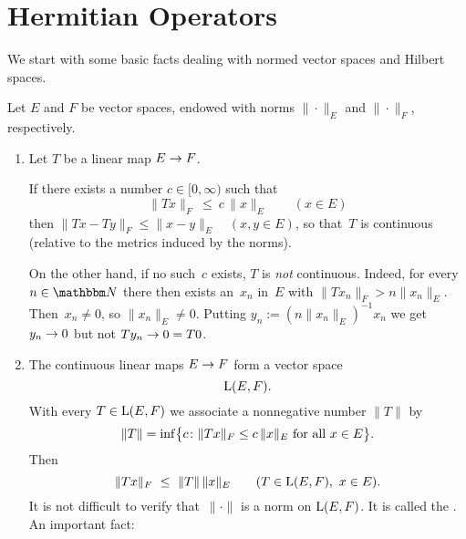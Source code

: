 \documentclass[main.tex]{subfiles}
\begin{document}
\section{Hermitian Operators}
We start with some basic facts dealing 
with normed vector spaces and Hilbert spaces.
%
%
\begin{psec}{5.1}%
Let $E$ and $F$ be vector spaces,
endowed with norms $\|\cdot\|_E$ and $\|\cdot\|_F$, respectively.
\begin{enumerate}
\item \label{5.1-1}
Let $T$ be a linear map $E\rightarrow F$.

If there exists a number $c\in [0,\infty)$ such that
\begin{equation*}
\|Tx\|_F \ \leq \ c\,\|x\|_E \qquad (x\in E)
\end{equation*}
then $\|Tx-Ty\|_F \leq \|x-y\|_E\quad (x,y\in E)$,
so that~$T$ is continuous
(relative to the metrics induced by the norms).

On the other hand,
if no such~$c$ exists,
$T$ is \emph{not} continuous.
Indeed,
for every $n\in\N$
there then exists an~$x_n$ in~$E$
with $\|T x_n\|_F > n \|x_n\|_E$.
Then~$x_n\neq 0$, so $\|x_n\|_E\neq 0$.
Putting $y_n:=(n\|x_n\|_E)^{-1}x_n$
we get $y_n\rightarrow 0$
but not $Ty_n\rightarrow 0=T0$.
%
\item \label{5.1-2}
The continuous linear maps $E\rightarrow F$ form a vector space
\begin{equation*}
\mathrm{L}(E,F)\text{.}
\end{equation*}
With every $T\in\mathrm{L}(E,F)$ 
we associate a nonnegative number $\| T \|$ by
\begin{equation*}
\|T\| = \inf \bigl\{ c\colon 
\|Tx\|_F \leq c\,\|x\|_E\text{ for all }x\in E\bigr\}\text{.}
\end{equation*}
Then
\begin{equation*}
\|Tx\|_F\ \leq\ \|T\|\,\|x\|_E \qquad (T\in\mathrm{L}(E,F),\ x\in E)\text{.}
\end{equation*}
It is not difficult to verify
that~$\|\cdot\|$ is a norm on $\mathrm{L}(E,F)$.
It is called the .
An important fact:
\end{enumerate}
\end{psec}
%
%
\end{document}
